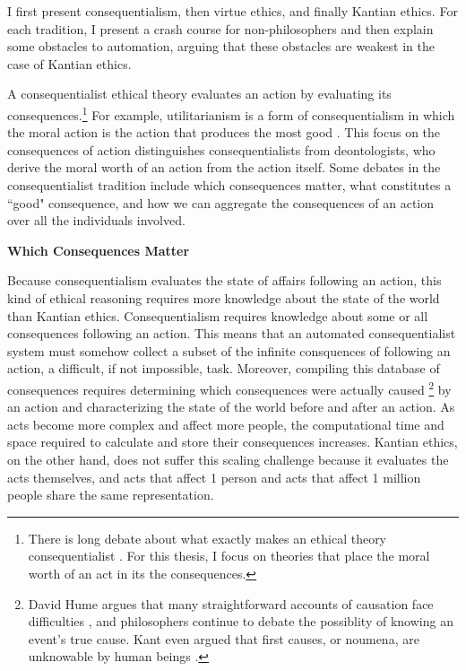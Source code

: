 \begin{isabellebody}
\begin{isamarkuptext}
I first present consequentialism, then virtue ethics, and finally Kantian ethics. For each 
tradition, I present a crash course for non-philosophers and then explain some obstacles to automation, 
arguing that these obstacles are weakest in the case of Kantian ethics.%
\end{isamarkuptext}\isamarkuptrue%
%
\isadelimdocument
%
\endisadelimdocument
%
\isatagdocument
%
\isamarkuptrue%
%
\endisatagdocument
{\isafolddocument}%
%
\isadelimdocument
%
\endisadelimdocument
%
\begin{isamarkuptext}%
A consequentialist ethical theory evaluates an 
action by evaluating its consequences.\footnote{There is long debate about what exactly makes an ethical theory consequentialist \citep{consequentialismsep}. 
For this thesis, I focus on theories that place the moral worth of an act in its the consequences.} For example, 
utilitarianism is a form of consequentialism in which the moral action 
is the action that produces the most good \citep{utilsep}. This focus
on the consequences of action distinguishes consequentialists from deontologists, who derive the moral worth
of an action from the action itself. Some debates in the consequentialist tradition include 
which consequences matter, what constitutes a ``good" consequence, and how we can 
aggregate the consequences of an action over all the individuals involved.%
\end{isamarkuptext}\isamarkuptrue%
%
\begin{isamarkuptext}%
\noindent \textbf{Which Consequences Matter}%
\end{isamarkuptext}\isamarkuptrue%
%
\begin{isamarkuptext}%
Because consequentialism evaluates the state of affairs following an action, this kind of ethical 
reasoning requires more knowledge about the state of the world than Kantian ethics. Consequentialism
requires knowledge about some or all consequences following an action. This means that an automated 
consequentialist system must somehow collect a subset of the infinite consquences of following an action, a difficult, 
if not impossible, task. Moreover, compiling this database of consequences requires 
determining which consequences were actually caused \footnote
{David Hume argues that many straightforward accounts of causation face difficulties \citep{hume}, 
and philosophers continue to debate the possiblity of knowing an event's true cause. Kant even argued
that first causes, or noumena, are unknowable by human beings \citep{kantnoumena}.} by an action and
characterizing the state of the world before and after an action. As acts become
more complex and affect more people, the computational time and space required to calculate and store
their consequences increases. Kantian ethics, on the other hand, does not suffer this scaling
challenge because it evaluates the acts themselves, and acts that affect 1 person and acts that 
affect 1 million people share the same representation.


\end{isamarkuptext}
\end{isabellebody}
